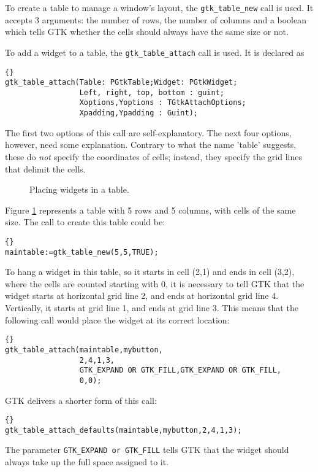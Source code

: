 \documentclass[10pt]{article}
\newif\ifpdf
\begin{document}
To create a table to manage a window's layout, the \lstinline|gtk_table_new|
call is used. It accepts 3 arguments: the number of rows, the number of
columns and a boolean which tells GTK whether the cells should always have
the same size or not. 

To add a widget to a table, the \lstinline|gtk_table_attach| call is used.
It is declared as
\begin{lstlisting}{}
gtk_table_attach(Table: PGtkTable;Widget: PGtkWidget;
                 Left, right, top, bottom : guint;
                 Xoptions,Yoptions : TGtkAttachOptions;
                 Xpadding,Ypadding : Guint);
\end{lstlisting}
The first two options of this call are self-explanatory. The next four
options, however, need some explanation. Contrary to what the name 'table'
suggests, these do {\em not} specify the coordinates of cells; instead, they
specify the grid lines that delimit the cells. 

\begin{figure}
\caption{Placing widgets in a table.\label{fig:table}}
\begin{center}
\ifpdf
\epsfig{file=table.pdf}
\else
{}
\fi
\end{center}
\end{figure}

Figure \ref{fig:table} represents a table with 5 rows and 5 columns, with
cells of the same size. The call to create this table could be:
\begin{lstlisting}{}
maintable:=gtk_table_new(5,5,TRUE);
\end{lstlisting}
To hang a widget in this table, so it starts in cell (2,1) and ends in cell
(3,2), where the cells are counted starting with 0, it is necessary to tell 
GTK that the widget starts at horizontal grid line 2, and ends at horizontal
grid line 4. Vertically, it starts at grid line 1, and ends at grid line 3. 
This means that the following call would place the widget at its correct
location:
\begin{lstlisting}{}
gtk_table_attach(maintable,mybutton,
                 2,4,1,3,
                 GTK_EXPAND OR GTK_FILL,GTK_EXPAND OR GTK_FILL,
                 0,0);
\end{lstlisting}
GTK delivers a shorter form of this call:
\begin{lstlisting}{}
gtk_table_attach_defaults(maintable,mybutton,2,4,1,3);
\end{lstlisting}
The parameter \lstinline|GTK_EXPAND or GTK_FILL| tells GTK that the widget 
should always take up the full space assigned to it.
\end{document}
